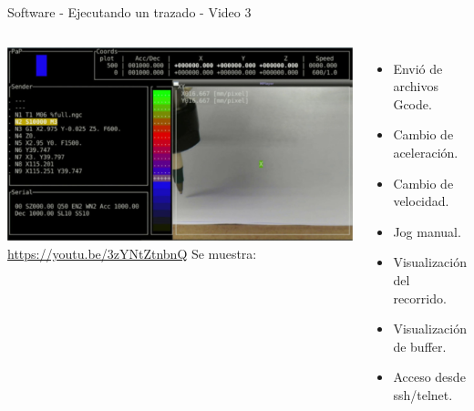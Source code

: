 \documentclass[aspectratio= 43]{beamer}
\begin{document}
\begin{frame}{Software - Ejecutando un trazado - Video 3}
   \begin{columns}
   \href{run:./videos/video3.mp4}{
      \includegraphics[width=\textwidth, left]{./videos/shot0003.jpg}
   }
   \href{https://youtu.be/3zYNtZtnbnQ}{https://youtu.be/3zYNtZtnbnQ}
      Se muestra:
      \begin{itemize}
         \item{Envió de archivos Gcode.}
         \item{Cambio de aceleración.}
         \item{Cambio de velocidad.}
         \item{Jog manual.}
         \item{Visualización del recorrido.}
         \item{Visualización de buffer.}
         \item{Acceso desde ssh/telnet.}
      \end{itemize}
   \end{columns}
\end{frame}
\end{document}
